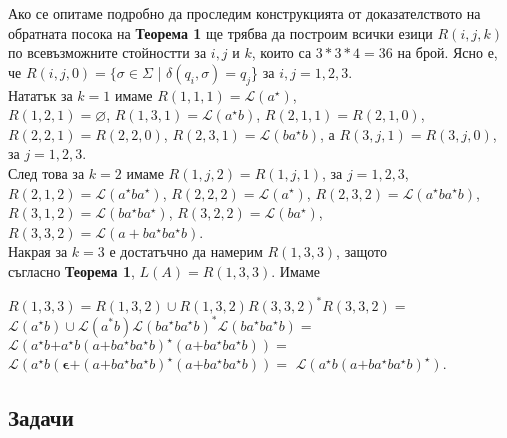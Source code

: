 \documentclass[openany]{book}
\newcommand{\bleft}{
    \boldsymbol{\left(\right.}
}
\newcommand{\bright}{
    \boldsymbol{\left.\right)}
}
\newcommand{\bplus}{
    \boldsymbol{+}
}
\newcommand{\bepsilon}{
    \boldsymbol{\epsilon}
}
\begin{document}
            Ако се опитаме подробно да проследим конструкцията от доказателството 
            на обратната посока на \textbf{Теорема 1} ще трябва да построим всички езици 
            $R(i,j,k)$ по всевъзможните стойностти за $i,j$ и $k$, които са $3*3*4 = 36$ на брой.
            Ясно е, че $R(i,j,0) = \{\sigma \in \Sigma$ | $\delta(q_i,\sigma) = q_j$\} за $i,j = 1,2,3$. \\
            \vspace{10pt}
            Нататък за $k = 1$ имаме $R(1,1,1) = \mathscr{L}(a^\star)$, \\ $R(1,2,1) = \varnothing$, 
            $R(1,3,1) = \mathscr{L}(a^\star b)$, $R(2,1,1) = R(2,1,0)$, \\ $R(2,2,1) = R(2,2,0)$,
            $R(2,3,1) = \mathscr{L}(b a^\star b)$, а $R(3,j,1) = R(3,j,0)$, \\ за $j=1,2,3$. \\
            \vspace{10pt}
            След това за $k = 2$ имаме $R(1,j,2) = R(1,j,1)$, за $j=1,2,3$, \\
            $R(2,1,2) = \mathscr{L}(a^\star b a^\star)$, $R(2,2,2) = \mathscr{L}(a^\star)$,
            $R(2,3,2) = \mathscr{L}(a^\star b a^\star b)$, \\ $R(3,1,2) = \mathscr{L}(b a^\star b a^\star)$,
            $R(3,2,2) = \mathscr{L}(b a^\star)$, $R(3,3,2) = \mathscr{L}(a + b a^\star b a^\star b)$.  \\
            \vspace{10pt}
            Накрая за $k = 3$ е достатъчно да намерим $R(1,3,3)$, защото \\
            съгласно \textbf{Теорема 1}, $L(A) = R(1,3,3)$. Имаме
            \begin{center}
                $R(1,3,3) = R(1,3,2) \cup R(1,3,2)R(3,3,2)^*R(3,3,2) =$
                $\mathscr{L}(a^\star b) \cup \mathscr{L}(a^*b)\mathscr{L}(b a^\star b a^\star b)^*\mathscr{L}(b a^\star b a^\star b) =$
                $\mathscr{L}(a^\star b \bplus a ^\star b \bleft a \bplus b a^\star b a^\star b \bright ^\star \bleft a \bplus b a^\star b a^\star b \bright) =$
                $\mathscr{L}(a^\star b \bleft \bepsilon \bplus \bleft a \bplus b a^\star b a^\star b \bright ^\star \bleft a \bplus b a^\star b a^\star b \bright) =$
                $\mathscr{L}(a^\star b \bleft a \bplus b a^\star b a^\star b \bright^\star)$.
            \end{center}
        
        \subsection{Задачи}
        
\end{document}
